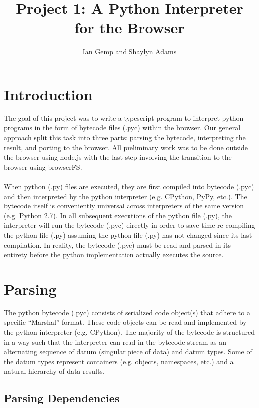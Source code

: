 \documentclass{article}
\begin{document}
\title{Project 1: A Python Interpreter for the Browser}
\author{Ian Gemp and Shaylyn Adams}
\maketitle

\section{Introduction}
The goal of this project was to write a typescript program to interpret python programs in the form of bytecode files (.pyc) within the browser.  Our general approach split this task into three parts: parsing the bytecode, interpreting the result, and porting to the browser.  All preliminary work was to be done outside the browser using node.js with the last step involving the transition to the browser using browserFS.\\
\\
When python (.py) files are executed, they are first compiled into bytecode (.pyc) and then interpreted by the python interpreter (e.g. CPython, PyPy, etc.).  The bytecode itself is conveniently universal across interpreters of the same version (e.g. Python 2.7).  In all subsequent executions of the python file (.py), the interpreter will run the bytecode (.pyc) directly in order to save time re-compiling the python file (.py) assuming the python file (.py) has not changed since its last compilation.  In reality, the bytecode (.pyc) must be read and parsed in its entirety before the python implementation actually executes the source.

\section{Parsing}

The python bytecode (.pyc) consists of serialized code object(s) that adhere to a specific ``Marshal'' format. These code objects can be read and implemented by the python interpreter (e.g. CPython).  The majority of the bytecode is structured in a way such that the interpreter can read in the bytecode stream as an alternating sequence of datum (singular piece of data) and datum types.  Some of the datum types represent containers (e.g. objects, namespaces, etc.) and a natural hierarchy of data results.

\subsection{Parsing Dependencies}
\end{document}
